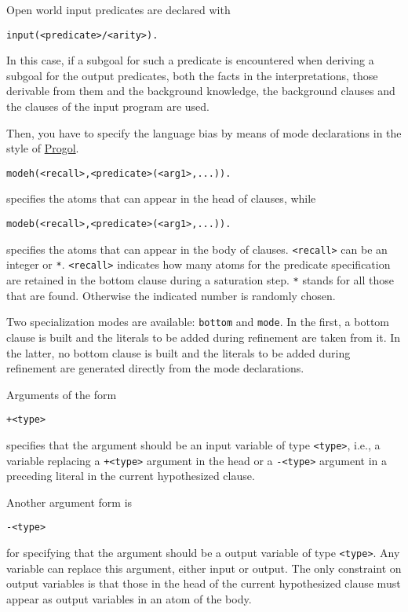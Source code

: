 Open world input predicates are declared with
\begin{verbatim}
input(<predicate>/<arity>).
\end{verbatim}
In this case, if a subgoal for such a predicate is encountered when deriving a subgoal for the output predicates, 
both the facts in the interpretations, those derivable from them and the background knowledge, the background clauses and the clauses of the input program are used.

Then, you have to specify the language bias by means of mode declarations in the style of 
\href{http://www.doc.ic.ac.uk/\string ~shm/progol.html}{Progol}.
\begin{verbatim}
modeh(<recall>,<predicate>(<arg1>,...)).
\end{verbatim}
specifies the atoms that can appear in the head of clauses, while
\begin{verbatim}
modeb(<recall>,<predicate>(<arg1>,...)).
\end{verbatim}
specifies the atoms that can appear in the body of clauses.
\texttt{<recall>} can be an integer or \texttt{*}.
\texttt{<recall>} indicates how many atoms for the predicate specification are
retained in the bottom clause during a saturation step. \texttt{*} stands for all those that are found. Otherwise the indicated number is randomly chosen.

Two specialization modes are available: \verb|bottom| and \verb|mode|.
In the first, a bottom clause is built and the literals to be added during 
refinement are taken from it. In the latter, no bottom clause is built and
the literals to be added during refinement are generated 
directly from the mode declarations. 

Arguments of the form
\begin{verbatim}
+<type>
\end{verbatim}
specifies that the argument should be an input variable of type \texttt{<type>}, i.e., a variable replacing a \texttt{+<type>} argument in the head or a \texttt{-<type>} argument in a preceding literal in the current hypothesized clause.

Another argument form is
\begin{verbatim}
-<type>
\end{verbatim}
for specifying that the argument should be a output variable of type \texttt{<type>}. 
Any variable can replace this argument, either input or output.
The only constraint on output variables is that those in the head of the current hypothesized 
clause must appear as output variables in an atom of the body.

